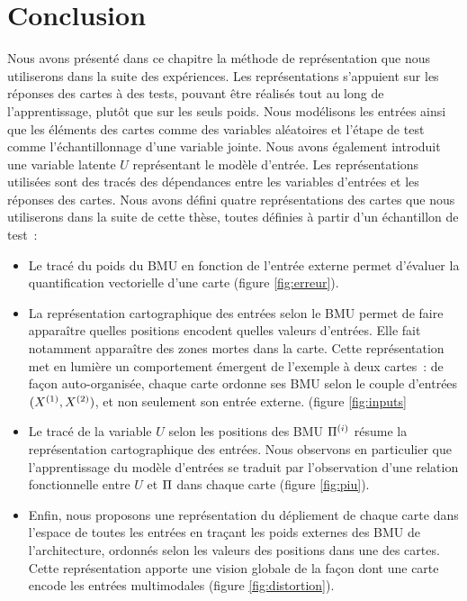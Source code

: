 \documentclass[../main]{subfiles}
\begin{document}
\section{Conclusion}
Nous avons présenté dans ce chapitre la méthode de représentation que nous utiliserons dans la suite des expériences.
Les représentations s'appuient sur les réponses des cartes à des tests, pouvant être réalisés tout au long de l'apprentissage, plutôt que sur les seuls poids.
Nous modélisons les entrées ainsi que les éléments des cartes comme des variables aléatoires et l'étape de test comme l'échantillonnage d'une variable jointe. Nous avons également introduit une variable latente $U$ représentant le modèle d'entrée.
Les représentations utilisées sont des tracés des dépendances entre les variables d'entrées et les réponses des cartes.
Nous avons défini quatre représentations des cartes que nous utiliserons dans la suite de cette thèse, toutes définies à partir d'un échantillon de test~:
\begin{itemize}
    \item Le tracé du poids du BMU en fonction de l'entrée externe permet d'évaluer la quantification vectorielle d'une carte (figure \ref{fig:erreur}).
    \item La représentation cartographique des entrées selon le BMU permet de faire apparaître quelles positions encodent quelles valeurs d'entrées. Elle fait notamment apparaître des zones mortes dans la carte. Cette représentation met en lumière un comportement émergent de l'exemple à deux cartes~: de façon auto-organisée, chaque carte ordonne ses BMU selon le couple d'entrées $(X^{({1})},X^{({2})})$, et non seulement son entrée externe. (figure \ref{fig:inputs}
    \item Le tracé de la variable $U$ selon les positions des BMU $\Pi^{({i})}$ résume la représentation cartographique des entrées. Nous observons en particulier que l'apprentissage du modèle d'entrées se traduit par l'observation d'une relation fonctionnelle entre $U$ et $\Pi$ dans chaque carte (figure \ref{fig:piu}).
    \item Enfin, nous proposons une représentation du dépliement de chaque carte dans l'espace de toutes les entrées en traçant les poids externes des BMU de l'architecture, ordonnés selon les valeurs des positions dans une des cartes. Cette représentation apporte une vision globale de la façon dont une carte encode les entrées multimodales (figure \ref{fig:distortion}).
\end{itemize}
\end{document}
